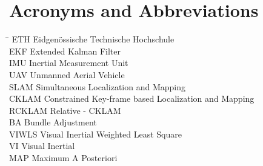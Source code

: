 \section*{Acronyms and Abbreviations}
\begin{tabbing}
 \hspace*{1.6cm}  \= \kill
 ETH \> Eidgenössische Technische Hochschule \\[0.5ex]
 EKF \> Extended Kalman Filter \\[0.5ex]
 IMU \> Inertial Measurement Unit \\[0.5ex]
 UAV \> Unmanned Aerial Vehicle \\[0.5ex]
 SLAM \> Simultaneous Localization and Mapping \\[0.5ex]
 CKLAM \> Constrained Key-frame based Localization and Mapping \\[0.5ex]
 RCKLAM \> Relative - CKLAM \\[0.5ex]
 BA \> Bundle Adjustment\\[0.5ex]
 VIWLS \> Visual Inertial Weighted Least Square\\[0.5ex]
 VI \> Visual Inertial\\[0.5ex]
 MAP \> Maximum A Posteriori
\end{tabbing}